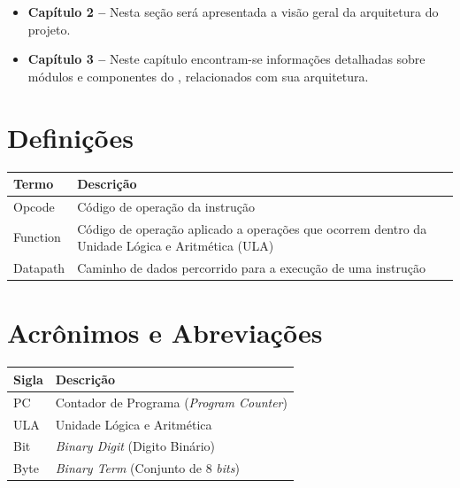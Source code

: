 \documentclass{report}
\begin{document}
  \begin{itemize}
  	\item \textbf{Capítulo 2 --} Nesta seção será apresentada a visão geral da arquitetura do projeto.
  	\item \textbf{Capítulo 3 --} Neste capítulo encontram-se informações detalhadas sobre módulos e componentes do \ipPROCESSProject, relacionados com sua arquitetura.
  \end{itemize}


  \section{Definições}
    \FloatBarrier
    \begin{table}[H]
      \begin{center}
        \begin{tabular}[pos]{|m{5cm} | m{9cm}|} 
          \hline
          \cellcolor[gray]{0.9}\textbf{Termo} & \cellcolor[gray]{0.9}\textbf{Descrição} \\ \hline
           Opcode   & Código de operação da instrução \\ \hline
           Function & Código de operação aplicado a operações que ocorrem dentro da Unidade Lógica e Aritmética (ULA)  \\ \hline
           Datapath & Caminho de dados percorrido para a execução de uma instrução \\ \hline
        \end{tabular}
      \end{center}
    \end{table}  

  \section{Acrônimos e Abreviações}
    \FloatBarrier
    \begin{table}[H]
      \begin{center}
        \begin{tabular}[pos]{|m{2cm} | m{12cm}|} 
          \hline
          \cellcolor[gray]{0.9}\textbf{Sigla} & \cellcolor[gray]{0.9}\textbf{Descrição} \\ \hline
             PC       &  Contador de Programa (\textit{Program Counter})\\ \hline
             ULA      &  Unidade Lógica e Aritmética\\ \hline
             Bit	  & \textit{Binary Digit} (Digito Binário) \\ \hline
          	 Byte	  & \textit{Binary Term} (Conjunto de 8 \textit{bits}) \\ \hline
        \end{tabular}
      \end{center}
    \end{table}  
\end{document}
